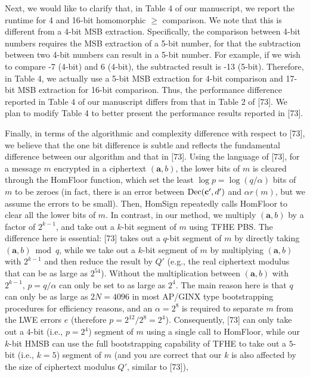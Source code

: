 Next, we would like to clarify that, in Table 4 of our
manuscript, we report the runtime for 4 and 16-bit
homomorphic $\geq$ comparison. We note that this is different
from a 4-bit MSB extraction. Specifically, the comparison
between 4-bit numbers requires the MSB extraction of a
5-bit number, for that the subtraction between two 4-bit
numbers can result in a 5-bit number. For example, if we
wish to compare -7 (4-bit) and 6 (4-bit), the subtracted
result is -13 (5-bit). Therefore, in Table 4, we actually
use a 5-bit MSB extraction for 4-bit comparison and 17-bit
MSB extraction for 16-bit comparison. Thus,
the performance difference 
reported in Table 4 of our manuscript differs from that in Table 2 of [73].
We plan to modify Table 4 to better present the performance results reported in [73].

Finally, in terms of the algorithmic and complexity difference
with respect to [73], we believe that the one bit difference is 
subtle and reflects the fundamental difference between our algorithm
and that in [73]. Using the language of [73],
for a message $m$
encrypted in a ciphertext $({\mathbf{a}}, b)$, the lower
bits of $m$ is cleared through the HomFloor function, which set
the least $\log{p}=\log{(q/\alpha)}$ bits of $m$ to be zeroes (in fact, there is an
error between ${\mathbf{\rm Dec}}({\mathbf{c}}', d')$ and 
$\alpha r(m)$, but we assume the errors to be small).
Then, HomSign repeatedly calls HomFloor to clear all the lower bits
of $m$. In contrast, in our method, we multiply $({\mathbf{a}}, b)$
by a factor of $2^{k-1}$, and take out a $k$-bit segment of $m$ using TFHE PBS.
The difference here is essential: [73] takes out a $q$-bit 
segment of $m$ by directly taking $({\mathbf{a}}, b)\bmod{q}$,
while we take out a $k$-bit segment of $m$ by multiplying 
$({\mathbf{a}}, b)$ with $2^{k-1}$ and then reduce the result
by $Q'$ (e.g., the real ciphertext modulus that can be as large as $2^{54}$).
Without the multiplication between $({\mathbf{a}}, b)$ with $2^{k-1}$,
$p=q/\alpha$ can only be set to as large as $2^{4}$. The main
reason here is that $q$ can only be as
large as $2N=4096$ in most AP/GINX type bootstrapping procedures for
efficiency reasons,
and an $\alpha=2^{8}$ is required to separate $m$ from the LWE errors
$e$ (therefore $p=2^{12}/2^{8}=2^{4}$). Consequently, [73] can only take 
out a $4$-bit (i.e., $p=2^{4}$) 
segment of $m$ using a single call to HomFloor, while our $k$-bit
HMSB can use the full bootstrapping capability of TFHE to take out a 
$5$-bit (i.e., $k=5$) segment of $m$ (and you are correct that
our $k$ is also affected by the size of ciphertext modulus $Q'$, similar to [73]),
